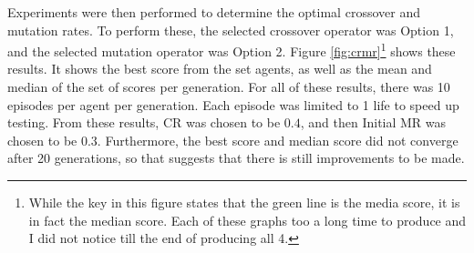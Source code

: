 Experiments were then performed to determine the optimal crossover and mutation rates. To perform these, the selected crossover operator was Option 1, and the selected mutation operator was Option 2. Figure \ref{fig:crmr}\footnote{While the key in this figure states that the green line is the media score, it is in fact the median score. Each of these graphs too a long time to produce and I did not notice till the end of producing all 4.} shows these results. It shows the best score from the set agents, as well as the mean and median of the set of scores per generation. For all of these results, there was 10 episodes per agent per generation. Each episode was limited to 1 life to speed up testing. From these results, CR was chosen to be $0.4$, and then Initial MR was chosen to be $0.3$. Furthermore, the best score and median score did not converge after 20 generations, so that suggests that there is still improvements to be made.

